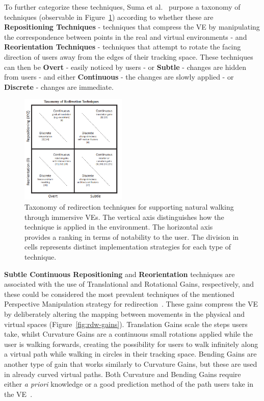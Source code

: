 To further categorize these techniques, Suma et al.~\cite{6180877} purpose a taxonomy of techniques (observable in Figure~\ref{fig:rdw-taxonomy}) 
according to whether these 
are \textbf{Repositioning Techniques} - techniques that compress the \gls{VE} by manipulating the correspondence between points in the real 
and virtual environments - and \textbf{Reorientation Techniques} - techniques that attempt to rotate the facing direction of users away from 
the edges of their tracking space. These techniques can then be \textbf{Overt} - easily noticed by users - or \textbf{Subtle} - changes are 
hidden from users - and either \textbf{Continuous} - the changes are slowly applied - or \textbf{Discrete} - changes are immediate.
\begin{figure}[b]
    \centering
    \includegraphics[width=0.45\textwidth]{NOVAthesisFiles/Images/papers/rdw-taxonomy.png}
    \caption[Taxonomy of Redirection Techniques]{Taxonomy of redirection techniques for supporting natural
    walking through immersive \glspl{VE}. The vertical axis
    distinguishes how the technique is applied in the environment. The
    horizontal axis provides a ranking in terms of notability to the user.
    The division in cells represents distinct implementation strategies for
    each type of technique.~\cite{6180877}}
    \label{fig:rdw-taxonomy}
\end{figure}

\textbf{Subtle Continuous Repositioning} and \textbf{Reorientation} techniques are associated with the use of Translational and 
Rotational Gains, respectively, and these could be considered the most prevalent techniques of the mentioned 
Perspective Manipulation strategy for redirection~\cite{Nilsson2018}. These gains compress the \gls{VE} by deliberately altering the 
mapping between movements in the physical and virtual spaces (Figure~\ref{fig:rdw-gains}). 
Translation Gains scale the steps users take, whilst Curvature 
Gains are a continuous small rotations applied while the user is walking forwards, creating the possibility for users to walk infinitely 
along a virtual path while walking in circles in their tracking space. Bending Gains are another type of gain that works similarly to 
Curvature Gains, but these are used in already curved virtual paths. Both Curvature and Bending Gains require either \textit{a priori} 
knowledge or a good prediction method of the path users take in the \gls{VE}~\cite{8255772}.

